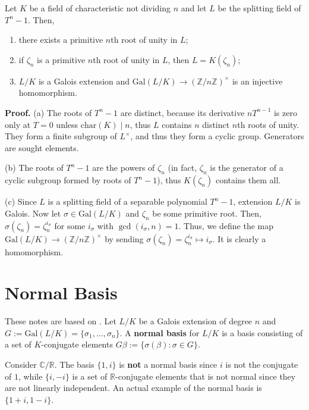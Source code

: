 \documentclass{template}
\begin{document}
\begin{proposition}
    Let $K$ be a field of characteristic not dividing $n$ and let $L$ be the
    splitting field of $T^n - 1$. Then,
    \begin{enumerate}
        \item[(a)] there exists a primitive $n$th root of unity in $L$;
        \item[(b)] if $\zeta_n$ is a primitive $n$th root of unity in $L$, then 
        $L=K(\zeta_n)$;
        \item[(c)] $L/K$ is a Galois extension and $\text{Gal}(L/K) \to
        (\mathbb{Z}/n\mathbb{Z})^{\times}$ is an injective homomorphism.
    \end{enumerate}
\end{proposition}

\textbf{Proof.} (a) The roots of $T^n-1$ are distinct, because its derivative
$nT^{n-1}$ is zero only at $T=0$ unless $\text{char}(K) \mid n$, thus $L$
contains $n$ distinct $n$th roots of unity. They form a finite subgroup of
$L^{\times}$, and thus they form a cyclic group. Generators are sought elements.

(b) The roots of $T^n-1$ are the powers of $\zeta_n$ (in fact, $\zeta_n$ is the
generator of a cyclic subgroup formed by roots of $T^n-1$), thus $K(\zeta_n)$
contains them all.

(c) Since $L$ is a splitting field of a separable polynomial $T^n-1$, extension
$L/K$ is Galois. Now let $\sigma \in \text{Gal}(L/K)$ and $\zeta_n$ be some
primitive root. Then, $\sigma(\zeta_n) = \zeta_n^{i_{\sigma}}$ for some
$i_{\sigma}$ with $\gcd(i_{\sigma}, n)=1$. Thus, we define the map
$\text{Gal}(L/K) \to (\mathbb{Z}/n\mathbb{Z})^{\times}$ by sending
$\sigma(\zeta_n)=\zeta_n^{i_{\sigma}} \mapsto i_{\sigma}$. It is clearly a
homomorphism.

\newpage

\section{Normal Basis}

These notes are based on \cite{conrad}. Let $L/K$ be a Galois extension of
degree $n$ and $G := \text{Gal}(L/K) = \{\sigma_1,\dots,\sigma_n\}$. A
\textbf{normal basis} for $L/K$ is a basis consisting of a set of $K$-conjugate
elements $G\beta := \{\sigma(\beta): \sigma \in G\}$.

\begin{example}
    Consider $\mathbb{C}/\mathbb{R}$. The basis $\{1,i\}$ is \textbf{not} a
    normal basis since $i$ is not the conjugate of $1$, while $\{i,-i\}$ is a
    set of $\mathbb{R}$-conjugate elements that is not normal since they are not
    linearly independent. An actual example of the normal basis is
    $\{1+i,1-i\}$.
\end{example}
\end{document}
